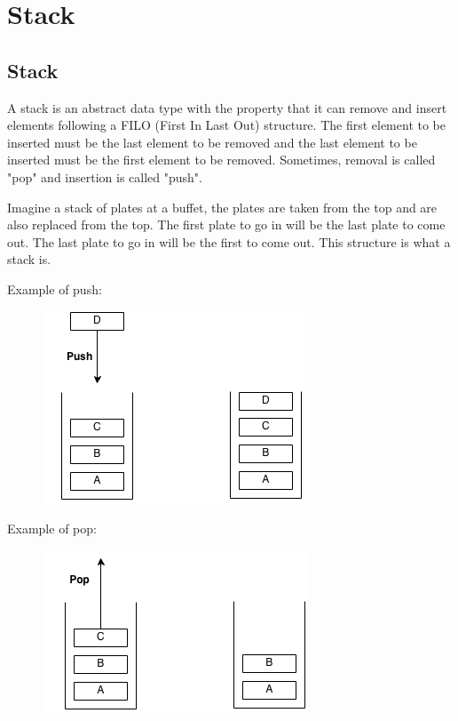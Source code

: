 \documentclass[11pt,oneside]{book}
\makeatletter
\def\maxwidth#1{\ifdim\Gin@nat@width>#1 #1\else\Gin@nat@width\fi}
\makeatother
\begin{document}
    \chapter{ Stack }
        \section{ Stack }
        

A stack is an abstract data type with the property that it can remove and insert elements following a FILO (First In Last Out) structure. The first element to be inserted must be the last element to be removed and the last element to be inserted must be the first element to be removed. Sometimes, removal is called "pop" and insertion is called "push".

Imagine a stack of plates at a buffet, the plates are taken from the top and are also replaced from the top. The first plate to go in will be the last plate to come out. The last plate to go in will be the first to come out. This structure is what a stack is.

Example of push:

\vspace{5px}\begin{figure}[H]\centering
        \includegraphics[width=0.66\maxwidth{\textwidth}]{stack.png}
        \end{figure}

Example of pop:

\vspace{5px}\begin{figure}[H]\centering
        \includegraphics[width=0.66\maxwidth{\textwidth}]{stack2.png}
        \end{figure}
\end{document}
